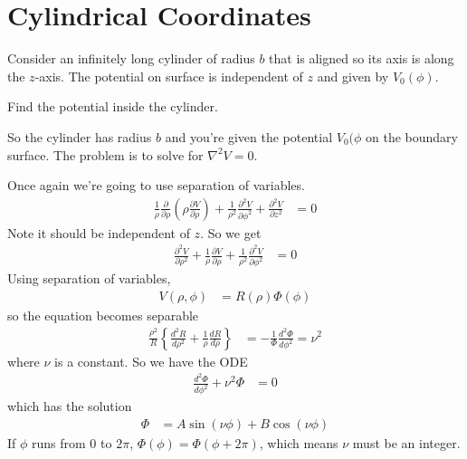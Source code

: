 \section{Cylindrical Coordinates}
\begin{example}
    Consider an infinitely long cylinder of radius $b$
    that is aligned so its axis is along the $z$-axis.
    The potential on surface is independent of $z$
    and given by $V_0(\phi)$.

    Find the potential inside the cylinder.
\end{example}
So the cylinder has radius $b$ and you're given the potential $V_0(\phi$ on the
boundary surface.
The problem is to solve for $\nabla^2 V=0$.

Once again we're going to use separation of variables.
\begin{align}
    \frac{1}{\rho}
    \frac{\partial}{\partial \rho}
    \left( 
    \rho
    \frac{\partial V}{\partial \rho}
    \right)
    +
    \frac{1}{\rho^2}
    \frac{\partial^2 V}{\partial \phi^2}
    +
    \frac{\partial^2 V}{\partial z^2}
    &=
    0
\end{align}
Note it should be independent of $z$.
So we get
\begin{align}
    \frac{\partial^2 V}{\partial \rho^2}
    +
    \frac{1}{\rho}
    \frac{\partial V}{\partial \rho}
    +
    \frac{1}{\rho^2}
    \frac{\partial^2 V}{\partial \phi^2}
    &=
    0
\end{align}
Using separation of variables,
\begin{align}
    V\left( \rho, \phi \right)
    &=
    R\left( \rho \right)
    \Phi\left( \phi \right)
\end{align}
so the equation becomes separable
\begin{align}
    \frac{\rho^2}{R}
    \left\{ 
    \frac{d^2 R}{d\rho^2}
    +
    \frac{1}{\rho}
    \frac{dR}{d\rho}
    \right\}
    &=
    -\frac{1}{\Phi}
    \frac{d^2 \Phi}{d\phi^2}
    =\nu^2
\end{align}
where $\nu$ is a constant.
So we have the ODE
\begin{align}
    \frac{d^2\Phi}{d\phi^2}
    +
    \nu^2 \Phi
    &= 0
\end{align}
which has the solution
\begin{align}
    \Phi
    &=
    A \sin\left( \nu \phi \right)
    +
    B \cos\left( \nu \phi \right)
\end{align}
If $\phi$ runs from $0$ to $2\pi$,
$\Phi(\phi) = \Phi\left( \phi + 2\pi \right)$,
which means $\nu$ must be an integer.


